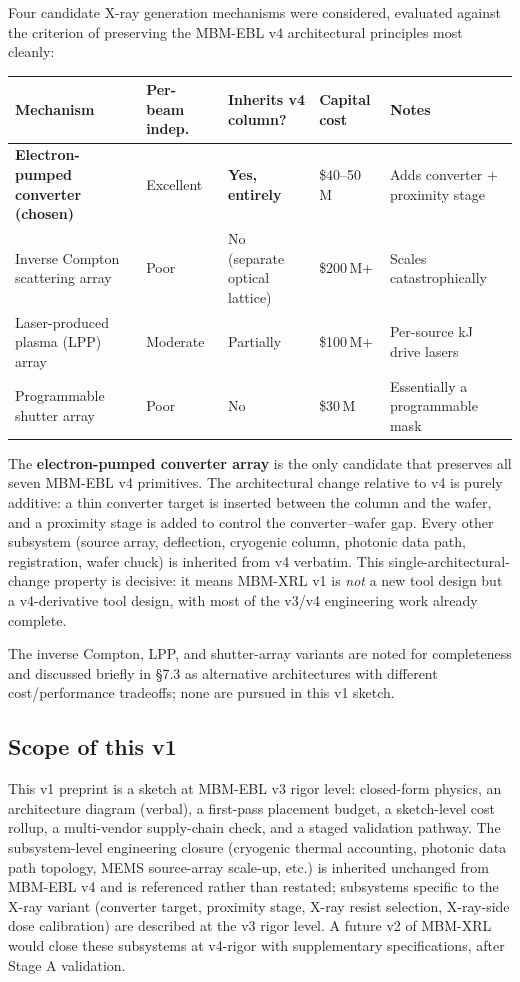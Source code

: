 \documentclass[11pt,letterpaper]{article}
\begin{document}
Four candidate X-ray generation mechanisms were considered, evaluated against the criterion of preserving the MBM-EBL v4 architectural principles most cleanly:

\begin{center}
\begin{tabular}{lllll}
\toprule
Mechanism & Per-beam indep. & Inherits v4 column? & Capital cost & Notes \\
\midrule
\textbf{Electron-pumped converter (chosen)} & Excellent & \textbf{Yes, entirely} & \$40--50\,M & Adds converter + proximity stage \\
Inverse Compton scattering array & Poor & No (separate optical lattice) & \$200\,M+ & Scales catastrophically \\
Laser-produced plasma (LPP) array & Moderate & Partially & \$100\,M+ & Per-source kJ drive lasers \\
Programmable shutter array & Poor & No & \$30\,M & Essentially a programmable mask \\
\bottomrule
\end{tabular}
\end{center}

The \textbf{electron-pumped converter array} is the only candidate that preserves all seven MBM-EBL v4 primitives. The architectural change relative to v4 is purely additive: a thin converter target is inserted between the column and the wafer, and a proximity stage is added to control the converter--wafer gap. Every other subsystem (source array, deflection, cryogenic column, photonic data path, registration, wafer chuck) is inherited from v4 verbatim. This single-architectural-change property is decisive: it means MBM-XRL v1 is \textit{not} a new tool design but a v4-derivative tool design, with most of the v3/v4 engineering work already complete.

The inverse Compton, LPP, and shutter-array variants are noted for completeness and discussed briefly in \S 7.3 as alternative architectures with different cost/performance tradeoffs; none are pursued in this v1 sketch.

\subsection{Scope of this v1}

This v1 preprint is a sketch at MBM-EBL v3 rigor level: closed-form physics, an architecture diagram (verbal), a first-pass placement budget, a sketch-level cost rollup, a multi-vendor supply-chain check, and a staged validation pathway. The subsystem-level engineering closure (cryogenic thermal accounting, photonic data path topology, MEMS source-array scale-up, etc.) is inherited unchanged from MBM-EBL v4 and is referenced rather than restated; subsystems specific to the X-ray variant (converter target, proximity stage, X-ray resist selection, X-ray-side dose calibration) are described at the v3 rigor level. A future v2 of MBM-XRL would close these subsystems at v4-rigor with supplementary specifications, after Stage A validation.
\end{document}
